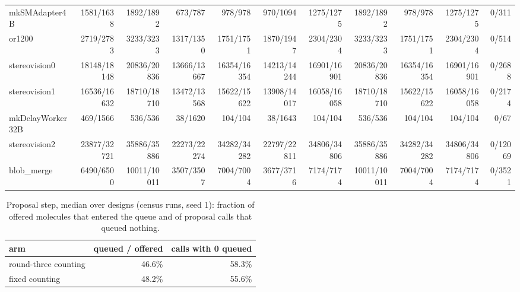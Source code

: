 \begin{table}[t]
\begin{tabular}{@{}lrrrrrrrrrr@{}}
mkSMAdapter4B & 1581/1638 & 1892/1892 & 673/787 & 978/978 & 970/1094 & 1275/1275 & 1892/1892 & 978/978 & 1275/1275 & 0/311 \\
or1200 & 2719/2783 & 3233/3233 & 1317/1350 & 1751/1751 & 1870/1947 & 2304/2304 & 3233/3233 & 1751/1751 & 2304/2304 & 0/514 \\
stereovision0 & 18148/18148 & 20836/20836 & 13666/13667 & 16354/16354 & 14213/14244 & 16901/16901 & 20836/20836 & 16354/16354 & 16901/16901 & 0/2688 \\
stereovision1 & 16536/16632 & 18710/18710 & 13472/13568 & 15622/15622 & 13908/14017 & 16058/16058 & 18710/18710 & 15622/15622 & 16058/16058 & 0/2174 \\
mkDelayWorker32B & 469/1566 & 536/536 & 38/1620 & 104/104 & 38/1643 & 104/104 & 536/536 & 104/104 & 104/104 & 0/67 \\
stereovision2 & 23877/32721 & 35886/35886 & 22273/22274 & 34282/34282 & 22797/22811 & 34806/34806 & 35886/35886 & 34282/34282 & 34806/34806 & 0/12069 \\
blob\_merge & 6490/6500 & 10011/10011 & 3507/3507 & 7004/7004 & 3677/3716 & 7174/7174 & 10011/10011 & 7004/7004 & 7174/7174 & 0/3521 \\
\bottomrule
\end{tabular}
\end{table}

\begin{table}[t]
\caption{Proposal step, median over designs (census runs, seed 1): fraction of offered molecules that entered the queue and of proposal calls that queued nothing.}
\label{tab:r4proposals}
\centering\small
\begin{tabular}{@{}lrr@{}}
\toprule
arm & queued / offered & calls with 0 queued \\
\midrule
round-three counting & 46.6\% & 58.3\% \\
fixed counting & 48.2\% & 55.6\% \\
\bottomrule
\end{tabular}
\end{table}
